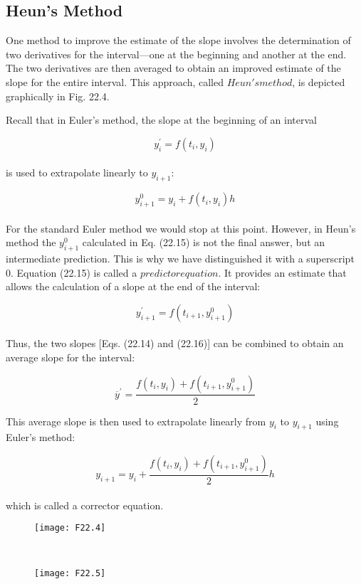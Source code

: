 \documentclass[../main.tex]{subfiles}
\begin{document}
\subsection{Heun's Method}
One method to improve the estimate of the slope involves the determination of two derivatives for the interval—one at the beginning and another at the end. The two derivatives are
then averaged to obtain an improved estimate of the slope for the entire interval. This approach, called $Heun's method$, is depicted graphically in Fig. 22.4.

Recall that in Euler's method, the slope at the beginning of an interval

\begin{equation}
\tag{22.14}
y^{'}_{i} = f(t_{i},y_{i})
\end{equation}\\
is used to extrapolate linearly to $y_{i+1}$:

\begin{equation}
\tag{22.15}
y^{0}_{i+1} = y_{i} + f( t_{i}, y_{i} )h
\end{equation}\\
For the standard Euler method we would stop at this point. However, in Heun's method the $y^{0}_{i+1}$ calculated in Eq. (22.15) is not the final answer, but an intermediate prediction. This is
why we have distinguished it with a superscript 0. Equation (22.15) is called a $predictor equation$. It provides an estimate that allows the calculation of a slope at the end of the interval:

\begin{equation}
\tag{22.16}
y^{'}_{i+1} = f( t_{i+1},y^{0}_{i+1})
\end{equation}\\
Thus, the two slopes [Eqs. (22.14) and (22.16)] can be combined to obtain an average slope
for the interval:


$$\overline{y}^{'} = \dfrac{f(t_{i},y_{i} ) + f(t_{i+1}, y^{0}_{i+1}) }{2}$$


This average slope is then used to extrapolate linearly from $y_{i}$ to $y_{i+1}$ using Euler's
method:

\begin{equation}
\tag{22.17}
y_{i+1} = y_{i} + \dfrac{f(t_{i},y_{i} ) + f(t_{i+1}, y^{0}_{i+1}) }{2}h
\end{equation}\\
which is called a corrector equation.\\
\begin{figure}[hbt!]
	\texttt{[image: F22.4]}
	\label{F22.4}
\end{figure}\\
\pagebreak
\begin{figure}[hbt!]
	\texttt{[image: F22.5]}
	\label{F22.5}
\end{figure}\\
\end{document}
